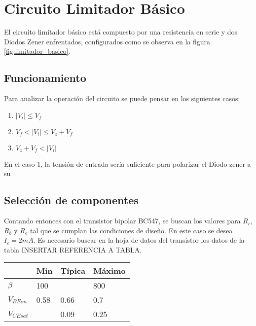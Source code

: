 \chapter{Circuito Limitador Básico}
El circuito limitador básico está compuesto por una resistencia en serie y dos Diodos Zener enfrentados, configurados como se observa en la figura \ref{fig:limitador_basico}.

\begin{figure}[ht]
    \begin{center}
        
        \label{fig:cambiar}
    \end{center}
\end{figure}

\section{Funcionamiento}
Para analizar la operación del circuito se puede pensar en los siguientes casos:

\begin{enumerate}
    \item $|V_i| \leq V_f$
    \item $V_f < |V_i| \leq V_z + V_f$
    \item $V_z + V_f < |V_i|$ 
\end{enumerate}

En el caso 1, la tensión de entrada sería suficiente para polarizar el Diodo zener a su 

\section{Selección de componentes}

Contando entonces con el transistor bipolar BC547, se buscan los valores para $R_c$, $R_b$ y $R_e$ tal que se cumplan las condiciones de diseño.
En este caso se desea $I_c =  2mA$. Es necesario buscar en la hoja de datos del transistor los datos de la tabla INSERTAR REFERENCIA A TABLA.
\begin{table}[]
    \begin{tabular}{l|l|l|l}
                  & Min  & Típica & Máximo \\ \hline
    $\beta$       & 100  &        & 800    \\ \hline
    $V_{BEon}$    & 0.58 & 0.66   & 0.7    \\ \hline
    $V_{CEsat}$   &      & 0.09   & 0.25  
    \end{tabular} \label{table:parametros transistor}
    \end{table}